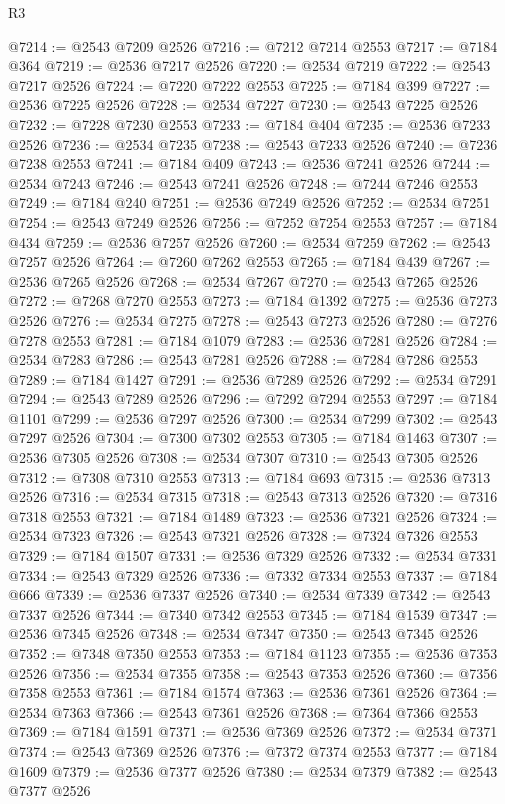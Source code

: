 \begin{lexlean}{R3}
\begin{coremodule}
@7214 := @2543 @7209 @2526
@7216 := @7212 @7214 @2553
@7217 := @7184 @364
@7219 := @2536 @7217 @2526
@7220 := @2534 @7219
@7222 := @2543 @7217 @2526
@7224 := @7220 @7222 @2553
@7225 := @7184 @399
@7227 := @2536 @7225 @2526
@7228 := @2534 @7227
@7230 := @2543 @7225 @2526
@7232 := @7228 @7230 @2553
@7233 := @7184 @404
@7235 := @2536 @7233 @2526
@7236 := @2534 @7235
@7238 := @2543 @7233 @2526
@7240 := @7236 @7238 @2553
@7241 := @7184 @409
@7243 := @2536 @7241 @2526
@7244 := @2534 @7243
@7246 := @2543 @7241 @2526
@7248 := @7244 @7246 @2553
@7249 := @7184 @240
@7251 := @2536 @7249 @2526
@7252 := @2534 @7251
@7254 := @2543 @7249 @2526
@7256 := @7252 @7254 @2553
@7257 := @7184 @434
@7259 := @2536 @7257 @2526
@7260 := @2534 @7259
@7262 := @2543 @7257 @2526
@7264 := @7260 @7262 @2553
@7265 := @7184 @439
@7267 := @2536 @7265 @2526
@7268 := @2534 @7267
@7270 := @2543 @7265 @2526
@7272 := @7268 @7270 @2553
@7273 := @7184 @1392
@7275 := @2536 @7273 @2526
@7276 := @2534 @7275
@7278 := @2543 @7273 @2526
@7280 := @7276 @7278 @2553
@7281 := @7184 @1079
@7283 := @2536 @7281 @2526
@7284 := @2534 @7283
@7286 := @2543 @7281 @2526
@7288 := @7284 @7286 @2553
@7289 := @7184 @1427
@7291 := @2536 @7289 @2526
@7292 := @2534 @7291
@7294 := @2543 @7289 @2526
@7296 := @7292 @7294 @2553
@7297 := @7184 @1101
@7299 := @2536 @7297 @2526
@7300 := @2534 @7299
@7302 := @2543 @7297 @2526
@7304 := @7300 @7302 @2553
@7305 := @7184 @1463
@7307 := @2536 @7305 @2526
@7308 := @2534 @7307
@7310 := @2543 @7305 @2526
@7312 := @7308 @7310 @2553
@7313 := @7184 @693
@7315 := @2536 @7313 @2526
@7316 := @2534 @7315
@7318 := @2543 @7313 @2526
@7320 := @7316 @7318 @2553
@7321 := @7184 @1489
@7323 := @2536 @7321 @2526
@7324 := @2534 @7323
@7326 := @2543 @7321 @2526
@7328 := @7324 @7326 @2553
@7329 := @7184 @1507
@7331 := @2536 @7329 @2526
@7332 := @2534 @7331
@7334 := @2543 @7329 @2526
@7336 := @7332 @7334 @2553
@7337 := @7184 @666
@7339 := @2536 @7337 @2526
@7340 := @2534 @7339
@7342 := @2543 @7337 @2526
@7344 := @7340 @7342 @2553
@7345 := @7184 @1539
@7347 := @2536 @7345 @2526
@7348 := @2534 @7347
@7350 := @2543 @7345 @2526
@7352 := @7348 @7350 @2553
@7353 := @7184 @1123
@7355 := @2536 @7353 @2526
@7356 := @2534 @7355
@7358 := @2543 @7353 @2526
@7360 := @7356 @7358 @2553
@7361 := @7184 @1574
@7363 := @2536 @7361 @2526
@7364 := @2534 @7363
@7366 := @2543 @7361 @2526
@7368 := @7364 @7366 @2553
@7369 := @7184 @1591
@7371 := @2536 @7369 @2526
@7372 := @2534 @7371
@7374 := @2543 @7369 @2526
@7376 := @7372 @7374 @2553
@7377 := @7184 @1609
@7379 := @2536 @7377 @2526
@7380 := @2534 @7379
@7382 := @2543 @7377 @2526

\end{coremodule}
\end{lexlean}
